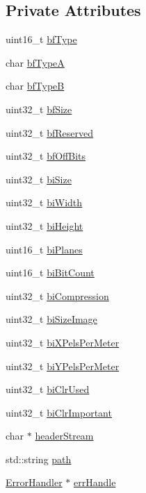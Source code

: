 \subsection*{Private Attributes}
\begin{DoxyCompactItemize}
\item 
uint16\+\_\+t \mbox{\hyperlink{classBitmapHeader_a84fd6f0b94fd4f47ddfea7c3439e8531}{bf\+Type}}
\item 
char \mbox{\hyperlink{classBitmapHeader_a27de047b18f59853f385b26b9fd74d20}{bf\+TypeA}}
\item 
char \mbox{\hyperlink{classBitmapHeader_a3fbb12d28c1be3095b72a5eebeaa4445}{bf\+TypeB}}
\item 
uint32\+\_\+t \mbox{\hyperlink{classBitmapHeader_ac27568af32658738302d20edab99bb4b}{bf\+Size}}
\item 
uint32\+\_\+t \mbox{\hyperlink{classBitmapHeader_abb50b0ca8951540f0bec6fe21b0a7587}{bf\+Reserved}}
\item 
uint32\+\_\+t \mbox{\hyperlink{classBitmapHeader_a0b3470f079b95b2a6f053ad7d860ec06}{bf\+Off\+Bits}}
\item 
uint32\+\_\+t \mbox{\hyperlink{classBitmapHeader_ad9bbbb6a668069bd7e6cd16adedce38f}{bi\+Size}}
\item 
uint32\+\_\+t \mbox{\hyperlink{classBitmapHeader_a6058b8b953cfe11ccb6992077e0353d0}{bi\+Width}}
\item 
uint32\+\_\+t \mbox{\hyperlink{classBitmapHeader_a76091025a4295933d3127ae41c6e6611}{bi\+Height}}
\item 
uint16\+\_\+t \mbox{\hyperlink{classBitmapHeader_ae3a65beab7af6e5dc8c9cda16bacc950}{bi\+Planes}}
\item 
uint16\+\_\+t \mbox{\hyperlink{classBitmapHeader_a9156116cca1502fb3f49f3da3890c70d}{bi\+Bit\+Count}}
\item 
uint32\+\_\+t \mbox{\hyperlink{classBitmapHeader_a07680e0e463506764ac69707bc51900c}{bi\+Compression}}
\item 
uint32\+\_\+t \mbox{\hyperlink{classBitmapHeader_a4ca96d50917d71818b503ebbe854503f}{bi\+Size\+Image}}
\item 
uint32\+\_\+t \mbox{\hyperlink{classBitmapHeader_a1569e156f59c8a939c9d4b668ae41bcd}{bi\+X\+Pels\+Per\+Meter}}
\item 
uint32\+\_\+t \mbox{\hyperlink{classBitmapHeader_a9f029a3b36773c4da51c18e0453213c7}{bi\+Y\+Pels\+Per\+Meter}}
\item 
uint32\+\_\+t \mbox{\hyperlink{classBitmapHeader_a621822a0df6f18b2f5f6bbebed1de028}{bi\+Clr\+Used}}
\item 
uint32\+\_\+t \mbox{\hyperlink{classBitmapHeader_ad90b0f2883207798cdd26f69af5510ba}{bi\+Clr\+Important}}
\item 
char $\ast$ \mbox{\hyperlink{classBitmapHeader_a9109a897251733f77942008318482426}{header\+Stream}}
\item 
std\+::string \mbox{\hyperlink{classBitmapHeader_a928111fbaf59eebf24b750cbca11c5dd}{path}}
\item 
\mbox{\hyperlink{classErrorHandler}{Error\+Handler}} $\ast$ \mbox{\hyperlink{classBitmapHeader_ab06f141245d592302dabe48571d12e32}{err\+Handle}}
\end{DoxyCompactItemize}


